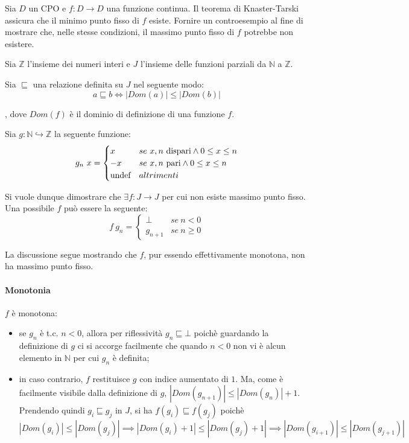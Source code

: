 \newcommand{\lt}{\ensuremath{\sqsubseteq}}

{
  Sia $D$ un CPO e $f: D \to D$ una funzione continua. Il teorema di
  Knaster-Tarski assicura che il minimo punto fisso di $f$ esiste.
  Fornire un controesempio al fine di mostrare che, nelle stesse condizioni, il
  massimo punto fisso di $f$ potrebbe non esistere.
}
{
}

Sia $\mathbb{Z}$ l'insieme dei numeri interi e $J$ l'insieme delle funzioni
parziali da $\mathbb{N}$ a $\mathbb{Z}$.

Sia \lt{} una relazione definita su $J$ nel seguente modo:
$$
a \lt b \iff |Dom(a)| \leq |Dom(b)|
$$

, dove $Dom(f)$ è il dominio di definizione di una funzione $f$.

Sia $g: \mathbb{N} \hookrightarrow{} \mathbb{Z}$ la seguente funzione:
$$
g_n\ x =
\begin{cases}
      x & se\ x,n\ \text{dispari} \land 0 \leq x \leq n \\
     -x & se\ x,n\ \text{pari}    \land 0 \leq x \leq n \\
     \textrm{\normalfont{undef}} & altrimenti
   \end{cases}
$$

Si vuole dunque dimostrare che $\exists{f} : J \to J$ per cui
non esiste massimo punto fisso. Una possibile $f$ può essere la seguente:
$$
f\ g_n =
\begin{cases}
      \bot    & se\ n < 0 \\
      g_{n+1} & se\ n \geq 0
   \end{cases}
$$

La discussione segue mostrando che $f$, pur essendo effettivamente monotona,
non ha massimo punto fisso.


\paragraph{Monotonia} $f$ è monotona:
\begin{itemize}
  \item se $g_n$ è t.c. $n < 0$, allora per riflessività $g_n \lt \bot$ poichè
    guardando la definizione di $g$ ci si accorge facilmente che quando $n < 0$
    non vi è alcun elemento in $\mathbb{N}$ per cui $g_n$ è definita;
  \item in caso contrario, $f$ restituisce $g$ con indice aumentato di $1$. Ma,
    come è facilmente visibile dalla definizione di $g$,
    $|Dom(g_{n+1})| \leq |Dom(g_n)| + 1$. Prendendo quindi $g_i \lt g_j$ in
    $J$, si ha
    $f(g_i) \lt f(g_j)$ poichè
    $$
    |Dom(g_i)| \leq |Dom(g_j)|
    \implies
    |Dom(g_i) + 1| \leq |Dom(g_j) + 1|
    \implies
    |Dom(g_{i+1})| \leq |Dom(g_{j+1})|
    $$
\end{itemize}

